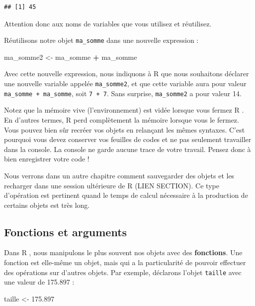 \documentclass[
  11pt,
  french,
]{book}
\makeatletter
\newenvironment{Shaded}{\begin{snugshade}}{\end{snugshade}}
\newcommand{\FloatTok}[1]{\textcolor[rgb]{0.00,0.00,0.81}{#1}}
\newcommand{\NormalTok}[1]{#1}
\newcommand{\OperatorTok}[1]{\textcolor[rgb]{0.81,0.36,0.00}{\textbf{#1}}}
\newcommand{\StringTok}[1]{\textcolor[rgb]{0.31,0.60,0.02}{#1}}
\newenvironment{kframe}{%
\medskip{}
\setlength{\fboxsep}{.8em}
 \def\at@end@of@kframe{}%
 \ifinner\ifhmode%
  \def\at@end@of@kframe{\end{minipage}}%
  \begin{minipage}{\columnwidth}%
 \fi\fi%
 \def\FrameCommand##1{\hskip\@totalleftmargin \hskip-\fboxsep
 \colorbox{shadecolor}{##1}\hskip-\fboxsep
     \hskip-\linewidth \hskip-\@totalleftmargin \hskip\columnwidth}%
 \MakeFramed {\advance\hsize-\width
   \@totalleftmargin\z@ \linewidth\hsize
   \@setminipage}}%
 {\par\unskip\endMakeFramed%
 \at@end@of@kframe}
\renewenvironment{Shaded}{\begin{kframe}}{\end{kframe}}
\makeatother
\begin{document}
\begin{verbatim}
## [1] 45
\end{verbatim}

Attention donc aux noms de variables que vous utilisez et réutilisez.

Réutilisons notre objet \texttt{ma\_somme} dans une nouvelle expression :

\begin{Shaded}
\begin{Highlighting}[]
\NormalTok{ma_somme2 <-}\StringTok{ }\NormalTok{ma_somme }\OperatorTok{+}\StringTok{ }\NormalTok{ma_somme}
\end{Highlighting}
\end{Shaded}

Avec cette nouvelle expression, nous indiquons à R que nous souhaitons déclarer une nouvelle variable appelée \texttt{ma\_somme2}, et que cette variable aura pour valeur \texttt{ma\_somme\ +\ ma\_somme}, soit \texttt{7\ +\ 7}. Sans surprise, \texttt{ma\_somme2} a pour valeur 14.

Notez que la mémoire vive (l'environnement) est vidée lorsque vous fermez R . En d'autres termes, R perd complètement la mémoire lorsque vous le fermez. Vous pouvez bien sûr recréer vos objets en relançant les mêmes syntaxes. C'est pourquoi vous devez conserver vos feuilles de codes et ne pas seulement travailler dans la console. La console ne garde aucune trace de votre travail. Pensez donc à bien enregistrer votre code !

Nous verrons dans un autre chapitre comment sauvegarder des objets et les recharger dans une session ultérieure de R (LIEN SECTION). Ce type d'opération est pertinent quand le temps de calcul nécessaire à la production de certains objets est très long.

\hypertarget{sect0_133}{%
\subsection{Fonctions et arguments}\label{sect0_133}}

Dans R , nous manipulons le plus souvent nos objets avec des \textbf{fonctions}. Une fonction est elle-même un objet, mais qui a la particularité de pouvoir effectuer des opérations sur d'autres objets. Par exemple, déclarons l'objet \texttt{taille} avec une valeur de 175.897 :

\begin{Shaded}
\begin{Highlighting}[]
\NormalTok{taille <-}\StringTok{ }\FloatTok{175.897}
\end{Highlighting}
\end{Shaded}
\end{document}

